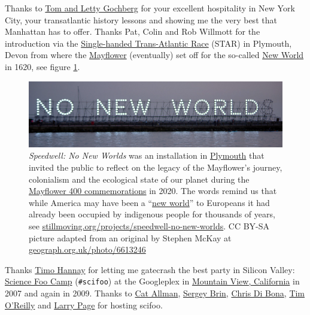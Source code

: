\documentclass[
]{book}
\begin{document}
Thanks to \href{https://wi.mit.edu/news/memoriam-thomas-gochberg}{Tom and Letty Gochberg} for your excellent hospitality in New York City, your transatlantic history lessons and showing me the very best that Manhattan has to offer. Thanks Pat, Colin and Rob Willmott for the introduction via the \href{https://en.wikipedia.org/wiki/Single-Handed_Trans-Atlantic_Race}{Single-handed Trans-Atlantic Race} (STAR) in Plymouth, Devon from where the \href{https://en.wikipedia.org/wiki/Mayflower}{Mayflower} (eventually) set off for the so-called \href{https://en.wikipedia.org/wiki/New_World}{New World} in 1620, see figure \ref{fig:neworld-fig}.

\begin{figure}

{\centering \includegraphics[width=0.99\linewidth]{images/no-new-world} 

}

\caption{\emph{Speedwell: No New Worlds} was an installation in \href{https://en.wikipedia.org/wiki/Plymouth}{Plymouth} that invited the public to reflect on the legacy of the Mayflower's journey, colonialism and the ecological state of our planet during the \href{https://www.mayflower400uk.org/}{Mayflower 400 commemorations} in 2020. The words remind us that while America may have been a ``\href{https://en.wikipedia.org/wiki/New_World}{new world}'' to Europeans it had already been occupied by indigenous people for thousands of years, see \href{https://stillmoving.org/projects/speedwell-no-new-worlds}{stillmoving.org/projects/speedwell-no-new-worlds}. CC BY-SA picture adapted from an original by Stephen McKay at \href{https://www.geograph.org.uk/photo/6613246}{geograph.org.uk/photo/6613246}}\label{fig:neworld-fig}
\end{figure}



Thanks \href{https://en.wikipedia.org/wiki/Timo_Hannay}{Timo Hannay} for letting me gatecrash the best party in Silicon Valley: \href{https://en.wikipedia.org/wiki/Science_Foo_Camp}{Science Foo Camp} (\texttt{\#scifoo}) at the Googleplex in \href{https://en.wikipedia.org/wiki/Mountain_View,_California}{Mountain View, California} in 2007 and again in 2009. Thanks to \href{https://en.wikipedia.org/wiki/Cat_Allman}{Cat Allman}, \href{https://en.wikipedia.org/wiki/Sergey_Brin}{Sergey Brin}, \href{https://en.wikipedia.org/wiki/Chris_DiBona}{Chris Di Bona}, \href{https://en.wikipedia.org/wiki/Tim_O\%27Reilly}{Tim O'Reilly} and \href{https://en.wikipedia.org/wiki/Larry_Page}{Larry Page} for hosting scifoo.
\end{document}
